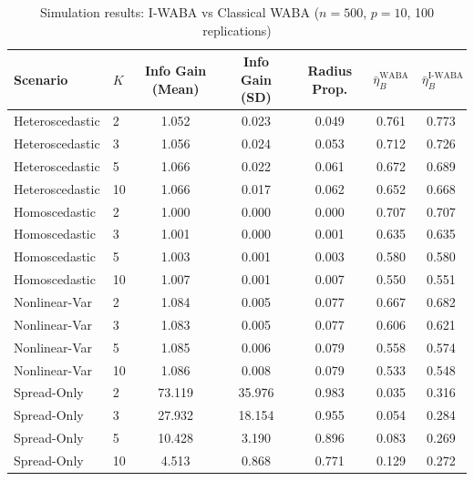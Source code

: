 \begin{table}[ht]
\centering
\caption{Simulation results: I-WABA vs Classical WABA ($n=500$, $p=10$, 100 replications)}
\label{tab:sim_results}
\begin{tabular}{llccccc}
\toprule
Scenario & $K$ & Info Gain (Mean) & Info Gain (SD) & Radius Prop. & $\bar{\eta}_B^{\text{WABA}}$ & $\bar{\eta}_B^{\text{I-WABA}}$ \\
\midrule
Heteroscedastic & 2 & 1.052 & 0.023 & 0.049 & 0.761 & 0.773 \\
Heteroscedastic & 3 & 1.056 & 0.024 & 0.053 & 0.712 & 0.726 \\
Heteroscedastic & 5 & 1.066 & 0.022 & 0.061 & 0.672 & 0.689 \\
Heteroscedastic & 10 & 1.066 & 0.017 & 0.062 & 0.652 & 0.668 \\
Homoscedastic & 2 & 1.000 & 0.000 & 0.000 & 0.707 & 0.707 \\
Homoscedastic & 3 & 1.001 & 0.000 & 0.001 & 0.635 & 0.635 \\
Homoscedastic & 5 & 1.003 & 0.001 & 0.003 & 0.580 & 0.580 \\
Homoscedastic & 10 & 1.007 & 0.001 & 0.007 & 0.550 & 0.551 \\
Nonlinear-Var & 2 & 1.084 & 0.005 & 0.077 & 0.667 & 0.682 \\
Nonlinear-Var & 3 & 1.083 & 0.005 & 0.077 & 0.606 & 0.621 \\
Nonlinear-Var & 5 & 1.085 & 0.006 & 0.079 & 0.558 & 0.574 \\
Nonlinear-Var & 10 & 1.086 & 0.008 & 0.079 & 0.533 & 0.548 \\
Spread-Only & 2 & 73.119 & 35.976 & 0.983 & 0.035 & 0.316 \\
Spread-Only & 3 & 27.932 & 18.154 & 0.955 & 0.054 & 0.284 \\
Spread-Only & 5 & 10.428 & 3.190 & 0.896 & 0.083 & 0.269 \\
Spread-Only & 10 & 4.513 & 0.868 & 0.771 & 0.129 & 0.272 \\
\bottomrule
\end{tabular}
\end{table}
